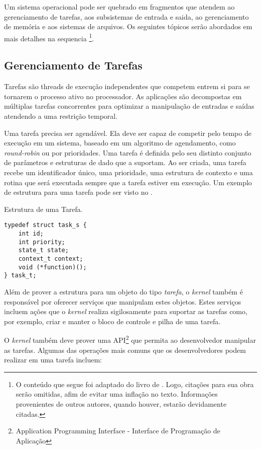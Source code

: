 Um sistema operacional pode ser quebrado em fragmentos que atendem ao gerenciamento de tarefas, aos subsistemas de entrada e saida, ao gerenciamento de memória e aos sistemas de arquivos. Os seguintes tópicos serão abordados em mais detalhes na sequencia \footnote{O conteúdo que segue foi adaptado do livro de . Logo, citações para sua obra serão omitidas, afim de evitar uma inflação no texto. Informações provenientes de outros autores, quando houver, estarão devidamente citadas.}.

\subsection{Gerenciamento de Tarefas}

Tarefas são threads de execução independentes que competem entrem si para se tornarem o processo ativo no processador. As aplicações são decompostas em múltiplas tarefas concorrentes para optimizar a manipulação de entradas e saídas atendendo a uma restrição temporal.

Uma tarefa precisa ser agendável. Ela deve ser capaz de competir pelo tempo de execução em um sistema, baseado em um algoritmo de agendamento, como \emph{round-robin} ou por prioridades. Uma tarefa é definida pelo seu distinto conjunto de parâmetros e estruturas de dado que a suportam. Ao ser criada, uma tarefa recebe um identificador único, uma prioridade, uma estrutura de contexto e uma rotina que será executada sempre que a tarefa estiver em execução. Um exemplo de estrutura para uma tarefa pode ser visto no .

\begin{listing}
	\caption{Estrutura de uma Tarefa.}
	\label{alg:struct_task}
	\centering
	\begin{verbatim}
typedef struct task_s {
	int id;
	int priority;
	state_t state;
	context_t context;
	void (*function)();	
} task_t;
	\end{verbatim}
\end{listing}

Além de prover a estrutura para um objeto do tipo \emph{tarefa}, o \emph{kernel} também é responsável por oferecer serviços que manipulam estes objetos. Estes serviços incluem ações que o \emph{kernel} realiza sigilosamente para suportar as tarefas como, por exemplo, criar e manter o bloco de controle e pilha de uma tarefa.

O \emph{kernel} também deve prover uma API\footnote{Application Programming Interface - Interface de Programação de Aplicação} que permita ao desenvolvedor manipular as tarefas. Algumas das operações mais comuns que os desenvolvedores podem realizar em uma tarefa incluem:

